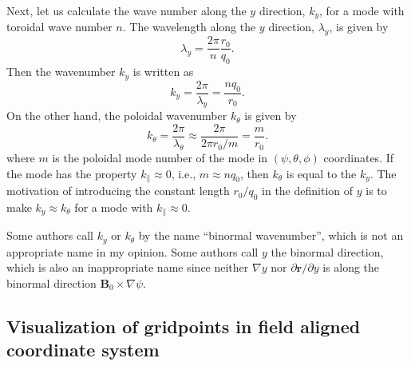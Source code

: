 \documentclass{llncs}
\begin{document}
Next, let us calculate the wave number along the $y$ direction, $k_y$, for a
mode with toroidal wave number $n$. The wavelength along the $y$ direction,
$\lambda_y$, is given by
\begin{equation}
  \label{20-4-20-a1} \lambda_y = \frac{2 \pi}{n}  \frac{r_0}{q_0} .
\end{equation}
Then the wavenumber $k_y$ is written as
\begin{equation}
  \label{20-4-20-a2} k_y = \frac{2 \pi}{\lambda_y} = \frac{n q_0}{r_0} .
\end{equation}
On the other hand, the poloidal wavenumber $k_{\theta}$ is given by
\begin{equation}
  k_{\theta} = \frac{2 \pi}{\lambda_{\theta}} \approx \frac{2 \pi}{2 \pi r_0 /
  m} = \frac{m}{r_0} .
\end{equation}
where $m$ is the poloidal mode number of the mode in $(\psi, \theta, \phi)$
coordinates. If the mode has the property $k_{\parallel} \approx 0$, i.e., $m
\approx n q_0$, then $k_{\theta}$ is equal to the $k_y$. The motivation of
introducing the constant length $r_0 / q_0$ in the definition of $y$ is to
make $k_y \approx k_{\theta}$ for a mode with $k_{\parallel} \approx 0$.

Some authors call $k_y$ or $k_{\theta}$ by the name ``binormal wavenumber'',
which is not an appropriate name in my opinion. Some authors call $y$ the
binormal direction, which is also an inappropriate name since neither $\nabla
y$ nor $\partial \mathbf{r}/ \partial y$ is along the binormal direction
$\mathbf{B}_0 \times \nabla \psi$.

\subsection{Visualization of gridpoints in field aligned coordinate system}
\end{document}
